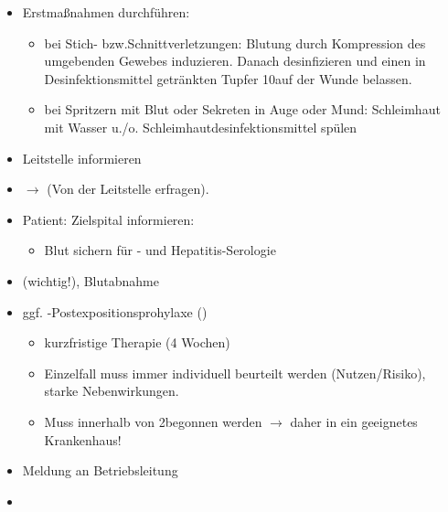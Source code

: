 {\label{m:nadelstichverletzung}}
{
\begin{itemize}
    \item Erstmaßnahmen durchführen: \nocite{OeAG2007}
    \begin{itemize}
        \item bei Stich- bzw.Schnittverletzungen:
        Blutung durch Kompression des umgebenden
        Gewebes induzieren. Danach desinfizieren und einen
        in Desinfektionsmittel getränkten Tupfer 10\Min*
        auf der Wunde belassen.
        \item bei Spritzern mit Blut oder Sekreten in Auge oder Mund:
        Schleimhaut mit Wasser u./o. Schleimhautdesinfektionsmittel spülen
    \end{itemize}
    \item Leitstelle informieren
    \item ${\rightarrow}$  (Von der Leitstelle erfragen).
    \item Patient: Zielspital informieren:
    \begin{itemize}
        \item Blut sichern für - und Hepatitis-Serologie
    \end{itemize}
    \item  {}  (wichtig!), Blutabnahme
    \item ggf. -Postexpositionsprohylaxe ()
    \begin{itemize}
        \item kurzfristige Therapie (4 Wochen)
        \item Einzelfall muss immer individuell beurteilt werden
        (Nutzen/Risiko), starke Nebenwirkungen.
        \item Muss innerhalb von 2\Hour* begonnen werden ${\rightarrow}$ daher
        \underline{} in ein geeignetes Krankenhaus!
    \end{itemize}
    \item Meldung an Betriebsleitung
    \item {}
\end{itemize}

}










